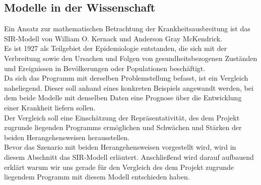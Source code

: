 \subsection*{Modelle in der Wissenschaft}
Ein Ansatz zur mathematischen Betrachtung der Krankheitsausbreitung ist das SIR-Modell von William O. Kernack und Anderson Gray McKendrick.\\
Es ist 1927 als Teilgebiet der Epidemiologie entstanden, die sich mit der Verbreitung sowie den Ursachen und Folgen von gesundheitsbezogenen Zuständen und Ereignissen in Bevölkerungen oder Populationen beschäftigt.\\
Da sich das Programm mit derselben Problemstellung befasst, ist ein Vergleich naheliegend.
Dieser soll anhand eines konkreten Beispiels angewandt werden, bei dem beide Modelle mit denselben Daten eine Prognose über die Entwicklung einer Krankheit liefern sollen.\\
Der Vergleich soll eine Einschätzung der Repräsentativität, des dem Projekt zugrunde liegenden Programms ermöglichen und Schwächen und Stärken der beiden Herangehensweisen herausstellen.\\
Bevor das Szenario mit beiden Herangehensweisen vorgestellt wird, wird in diesem Abschnitt das SIR-Modell erläutert. Anschließend wird darauf aufbauend erklärt warum wir uns gerade für den Vergleich des dem Projekt zugrunde liegendem Programm mit diesem Modell entschieden haben.

